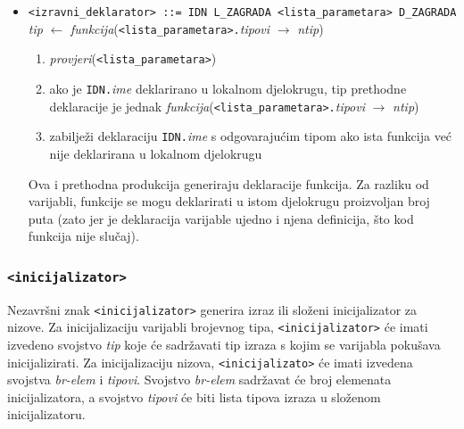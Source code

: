 \documentclass[times, 12pt, utf8]{book}
\begin{document}
\begin{itemize}
\item
\verb|<izravni_deklarator> ::= IDN L_ZAGRADA <lista_parametara> D_ZAGRADA|\\
\emph{tip} \(\leftarrow\) \emph{funkcija}(\verb|<lista_parametara>.|\emph{tipovi} \(\to\) \emph{ntip})
\begin{enumerate}
\item
\emph{provjeri}(\verb|<lista_parametara>|)
\item
ako je \verb|IDN.|\emph{ime} deklarirano u lokalnom djelokrugu, tip prethodne deklaracije je jednak \emph{funkcija}(\verb|<lista_parametara>.|\emph{tipovi} \(\to\) \emph{ntip})
\item
zabilježi deklaraciju \verb|IDN.|\emph{ime} s odgovarajućim tipom ako ista funkcija već nije deklarirana u lokalnom djelokrugu
\end{enumerate}

Ova i prethodna produkcija generiraju deklaracije funkcija.
Za razliku od varijabli, funkcije se mogu deklarirati u istom djelokrugu proizvoljan broj puta (zato jer je deklaracija varijable ujedno i njena definicija, što kod funkcija nije slučaj).

\end{itemize}


\subsubsection{\texttt{<inicijalizator>}}

Nezavršni znak \verb|<inicijalizator>| generira izraz ili složeni inicijalizator za nizove.
Za inicijalizaciju varijabli brojevnog tipa, \verb|<inicijalizator>| će imati izvedeno svojstvo \emph{tip} koje će sadržavati tip izraza s kojim se varijabla pokušava inicijalizirati.
Za inicijalizaciju nizova, \verb|<inicijalizato>| će imati izvedena svojstva \emph{br-elem} i \emph{tipovi}.
Svojstvo \emph{br-elem} sadržavat će broj elemenata inicijalizatora, a svojstvo \emph{tipovi} će biti lista tipova izraza u složenom inicijalizatoru.
\end{document}
